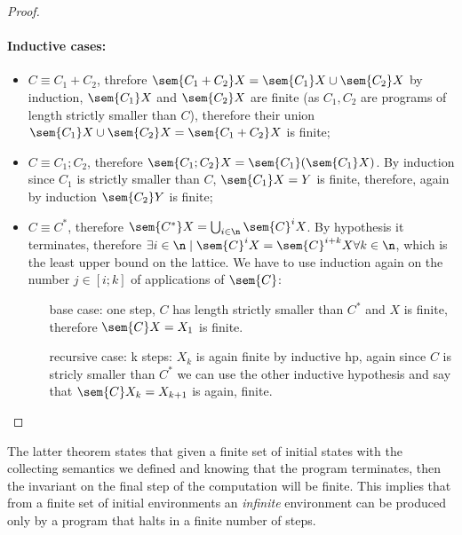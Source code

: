\begin{proof}
  \paragraph*{Inductive cases: \\}
  \begin{itemize}
  \item \(C \equiv C_1 + C_2\), threfore \(\sem{C_1 +C_2}X =
    \sem{C_1}X \cup \sem{C_2}X\) by induction, \(\sem{C_1}X\) and
    \(\sem{C_2}X\) are finite (as \(C_1, C_2\) are programs of length
    strictly smaller than \(C\)), therefore their union \(\sem{C_1}X
    \cup \sem{C_2}X = \sem{C_1 +C_2}X\) is finite;
  \item \(C \equiv C_1; C_2\), therefore \(\sem{C_1;C_2}X =
    \sem{C_1}(\sem{C_1}X)\). By induction since \(C_1\) is strictly
    smaller than \(C\), \(\sem{C_1}X = Y\) is finite, therefore, again
    by induction \(\sem{C_2}Y\) is finite;
  \item \(C \equiv C^*\), therefore \(\sem{C^*}X =
    \bigcup_{i\in\n}\sem{C}^iX\). By hypothesis it terminates,
    therefore \(\exists i \in \n \mid \sem{C}^iX = \sem{C}^{i+k}X
    \forall k \in \n\), which is the least upper bound on the
    lattice. We have to use induction again on the number \(j \in
    [i;k]\) of applications of \(\sem{C}\):
    \begin{itemize}
    \item[base case:] one step, \(C\) has length strictly smaller than
      \(C^*\) and \(X\) is finite, therefore \(\sem{C}X = X_1\) is finite.
    \item[recursive case:] k steps: \(X_k\) is again finite by
      inductive hp, again since \(C\) is stricly smaller than \(C^*\)
      we can use the other inductive hypothesis and say that
      \(\sem{C}X_k = X_{k+1}\) is again, finite.
    \end{itemize}
  \end{itemize}
\end{proof}

\begin{observation}
  The latter theorem states that given a finite set of initial states
  with the collecting semantics we defined and knowing that the
  program terminates, then the invariant on the final step of the
  computation will be finite. This implies that from a finite set of
  initial environments an \emph{infinite} environment can be produced
  only by a program that halts in a finite number of steps.
\end{observation}

